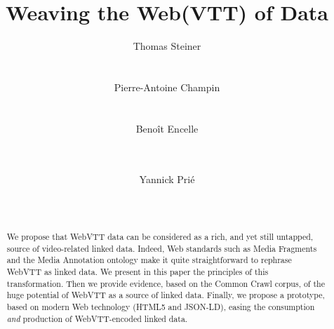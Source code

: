\documentclass{sig-alternate}
\begin{document}
%

\title{Weaving the Web(VTT) of Data}


\author{
\alignauthor
Thomas Steiner\\
       \\
       \\
\alignauthor
Pierre-Antoine Champin\\
       \\
       \\
\alignauthor
Benoît Encelle\\
       \\
       \\
\and  %
\alignauthor
Yannick Prié\\
       \\
       \\
}

\maketitle
\begin{abstract}
We propose that WebVTT data can be considered as a rich, and yet still untapped, source of video-related linked data. Indeed, Web standards such as Media Fragments and the Media Annotation ontology make it quite straightforward to rephrase WebVTT as linked data. We present in this paper the principles of this transformation. Then we provide evidence, based on the Common Crawl corpus, of the huge potential of WebVTT as a source of linked data. Finally, we propose a prototype, based on modern Web technology (HTML5 and JSON-LD), easing the consumption \emph{and} production of WebVTT-encoded linked data.

\end{abstract}
\end{document}
